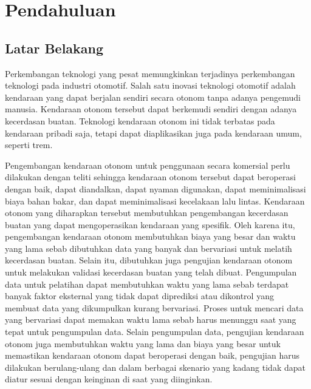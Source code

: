 \chapter{Pendahuluan}



\section{Latar Belakang}

Perkembangan teknologi yang pesat memungkinkan terjadinya perkembangan teknologi
pada industri otomotif. Salah satu inovasi teknologi otomotif adalah kendaraan
yang dapat berjalan sendiri secara otonom tanpa adanya pengemudi manusia.
Kendaraan otonom tersebut dapat berkemudi sendiri dengan adanya kecerdasan
buatan. Teknologi kendaraan otonom ini tidak terbatas pada kendaraan pribadi
saja, tetapi dapat diaplikasikan juga pada kendaraan umum, seperti trem.

Pengembangan kendaraan otonom untuk penggunaan secara komersial perlu dilakukan
dengan teliti sehingga kendaraan otonom tersebut dapat beroperasi dengan baik,
dapat diandalkan, dapat nyaman digunakan, dapat meminimalisasi biaya bahan
bakar, dan dapat meminimalisasi kecelakaan lalu lintas. Kendaraan otonom yang
diharapkan tersebut membutuhkan pengembangan kecerdasan buatan yang dapat
mengoperasikan kendaraan yang spesifik. Oleh karena itu, pengembangan kendaraan
otonom membutuhkan biaya yang besar dan waktu yang lama sebab dibutuhkan data
yang banyak dan bervariasi untuk melatih kecerdasan buatan. Selain itu,
dibutuhkan juga pengujian kendaraan otonom untuk melakukan validasi kecerdasan
buatan yang telah dibuat. Pengumpulan data untuk pelatihan dapat membutuhkan
waktu yang lama sebab terdapat banyak faktor eksternal yang tidak dapat
diprediksi atau dikontrol yang membuat data yang dikumpulkan kurang bervariasi.
Proses untuk mencari data yang bervariasi dapat memakan waktu lama sebab harus
menunggu saat yang tepat untuk pengumpulan data. Selain pengumpulan data,
pengujian kendaraan otonom juga membutuhkan waktu yang lama dan biaya yang besar
untuk memastikan kendaraan otonom dapat beroperasi dengan baik, pengujian harus
dilakukan berulang-ulang dan dalam berbagai skenario yang kadang tidak dapat
diatur sesuai dengan keinginan di saat yang diinginkan.

